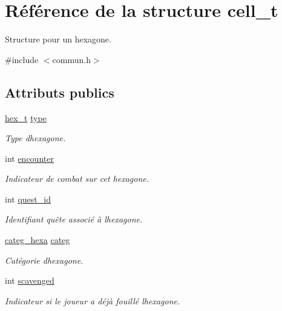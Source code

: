 \hypertarget{structcell__t}{}\section{Référence de la structure cell\+\_\+t}
\label{structcell__t}


Structure pour un hexagone.  




{\ttfamily \#include $<$commun.\+h$>$}

\subsection*{Attributs publics}
\begin{DoxyCompactItemize}
\item 
\mbox{\label{structcell__t_a66c2fa642b86f578d53a81ac07a55d1b}} 
\hyperlink{commun_8h_a86b2798c02561aa7def13bc6565d7290}{hex\+\_\+t} \hyperlink{structcell__t_a66c2fa642b86f578d53a81ac07a55d1b}{type}
\begin{DoxyCompactList}\small\item\em Type d\textquotesingle{}hexagone. \end{DoxyCompactList}\item 
\mbox{\label{structcell__t_abc3bb71be6dae9d877c93466ca6b33bf}} 
int \hyperlink{structcell__t_abc3bb71be6dae9d877c93466ca6b33bf}{encounter}
\begin{DoxyCompactList}\small\item\em Indicateur de combat sur cet hexagone. \end{DoxyCompactList}\item 
\mbox{\label{structcell__t_a423bd6e6116b13f0c95874c077ef621f}} 
int \hyperlink{structcell__t_a423bd6e6116b13f0c95874c077ef621f}{quest\+\_\+id}
\begin{DoxyCompactList}\small\item\em Identifiant quête associé à l\textquotesingle{}hexagone. \end{DoxyCompactList}\item 
\mbox{\label{structcell__t_a4dad1e69c65d988a67fc7438554e0765}} 
\hyperlink{commun_8h_a730487a66d035e35d2c63cfa39cea020}{categ\+\_\+hexa} \hyperlink{structcell__t_a4dad1e69c65d988a67fc7438554e0765}{categ}
\begin{DoxyCompactList}\small\item\em Catégorie d\textquotesingle{}hexagone. \end{DoxyCompactList}\item 
\mbox{\label{structcell__t_a9d1306d23d20d0255bb3bb9fa9f7cbe5}} 
int \hyperlink{structcell__t_a9d1306d23d20d0255bb3bb9fa9f7cbe5}{scavenged}
\begin{DoxyCompactList}\small\item\em Indicateur si le joueur a déjà fouillé l\textquotesingle{}hexagone. \end{DoxyCompactList}\end{DoxyCompactItemize}


